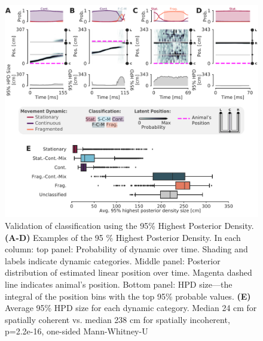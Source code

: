 \documentclass[times, twoside]{zHenriquesLab-StyleBioRxiv}
\begin{document}
\begin{figure}%
\centering
\includegraphics[width=0.80\linewidth]{figures/Figure4/Figure4_v6}
\caption{Validation of classification using the 95\% Highest Posterior Density. \textbf{(A-D)}  Examples of the 95 \% Highest Posterior Density. In each column: top panel: Probability of dynamic over time. Shading and labels indicate dynamic categories. Middle panel: Posterior distribution of estimated linear position over time. Magenta dashed line indicates animal's position. Bottom panel: HPD size---the integral of the position bins with the top 95\% probable values. \textbf{(E)} Average 95\% HPD size for each dynamic category. Median 24 cm for spatially coherent vs. median 238 cm for spatially incoherent, p=2.2e-16, one-sided Mann-Whitney-U}
\label{4}
\end{figure}
\end{document}
